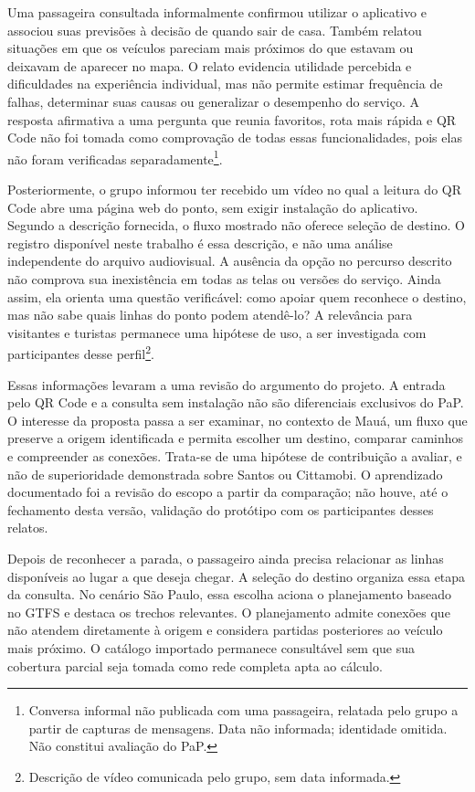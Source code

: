 \documentclass[12pt,oneside,a4paper,brazil,chapter=TITLE]{abntex2}
\begin{document}
Uma passageira consultada informalmente confirmou utilizar o aplicativo e associou suas previsões à decisão de quando sair de casa. Também relatou situações em que os veículos pareciam mais próximos do que estavam ou deixavam de aparecer no mapa. O relato evidencia utilidade percebida e dificuldades na experiência individual, mas não permite estimar frequência de falhas, determinar suas causas ou generalizar o desempenho do serviço. A resposta afirmativa a uma pergunta que reunia favoritos, rota mais rápida e QR Code não foi tomada como comprovação de todas essas funcionalidades, pois elas não foram verificadas separadamente\footnote{Conversa informal não publicada com uma passageira, relatada pelo grupo a partir de capturas de mensagens. Data não informada; identidade omitida. Não constitui avaliação do PaP.}.

Posteriormente, o grupo informou ter recebido um vídeo no qual a leitura do QR Code abre uma página web do ponto, sem exigir instalação do aplicativo. Segundo a descrição fornecida, o fluxo mostrado não oferece seleção de destino. O registro disponível neste trabalho é essa descrição, e não uma análise independente do arquivo audiovisual. A ausência da opção no percurso descrito não comprova sua inexistência em todas as telas ou versões do serviço. Ainda assim, ela orienta uma questão verificável: como apoiar quem reconhece o destino, mas não sabe quais linhas do ponto podem atendê-lo? A relevância para visitantes e turistas permanece uma hipótese de uso, a ser investigada com participantes desse perfil\footnote{Descrição de vídeo comunicada pelo grupo, sem data informada.}.

Essas informações levaram a uma revisão do argumento do projeto. A entrada pelo QR Code e a consulta sem instalação não são diferenciais exclusivos do PaP. O interesse da proposta passa a ser examinar, no contexto de Mauá, um fluxo que preserve a origem identificada e permita escolher um destino, comparar caminhos e compreender as conexões. Trata-se de uma hipótese de contribuição a avaliar, e não de superioridade demonstrada sobre Santos ou Cittamobi. O aprendizado documentado foi a revisão do escopo a partir da comparação; não houve, até o fechamento desta versão, validação do protótipo com os participantes desses relatos.

Depois de reconhecer a parada, o passageiro ainda precisa relacionar as linhas disponíveis ao lugar a que deseja chegar. A seleção do destino organiza essa etapa da consulta. No cenário São Paulo, essa escolha aciona o planejamento baseado no GTFS e destaca os trechos relevantes. O planejamento admite conexões que não atendem diretamente à origem e considera partidas posteriores ao veículo mais próximo. O catálogo importado permanece consultável sem que sua cobertura parcial seja tomada como rede completa apta ao cálculo.
\end{document}
